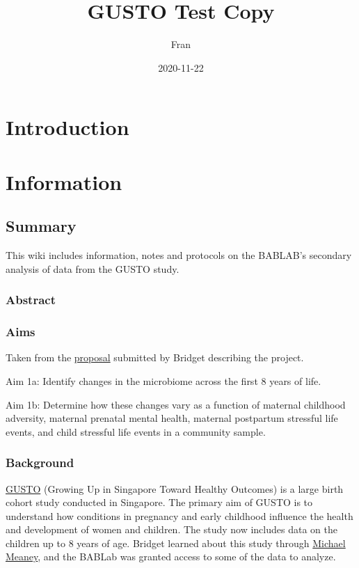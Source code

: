 \documentclass[
]{book}
\title{GUSTO Test Copy}
\author{Fran}
\date{2020-11-22}
\begin{document}
\maketitle

{
\setcounter{tocdepth}{1}
\tableofcontents
}
\hypertarget{introduction}{%
\chapter{Introduction}\label{introduction}}

\hypertarget{information}{%
\chapter{Information}\label{information}}

\hypertarget{summary}{%
\section{Summary}\label{summary}}

This wiki includes information, notes and protocols on the BABLAB's secondary analysis of data from the GUSTO study.

\hypertarget{abstract}{%
\subsection{Abstract}\label{abstract}}

\hypertarget{aims}{%
\subsection{Aims}\label{aims}}

Taken from the \href{https://ucla.app.box.com/file/740587024475}{proposal} submitted by Bridget describing the project.

Aim 1a: Identify changes in the microbiome across the first 8 years of life.

Aim 1b: Determine how these changes vary as a function of maternal childhood adversity, maternal prenatal mental health, maternal postpartum stressful life events, and child stressful life events in a community sample.

\hypertarget{background}{%
\subsection{Background}\label{background}}

\href{http://www.gusto.sg/}{GUSTO} (Growing Up in Singapore Toward Healthy Outcomes) is a large birth cohort study conducted in Singapore. The primary aim of GUSTO is to understand how conditions in pregnancy and early childhood influence the health and development of women and children. The study now includes data on the children up to 8 years of age. Bridget learned about this study through \href{https://douglas.research.mcgill.ca/michael-meaney}{Michael Meaney}, and the BABLab was granted access to some of the data to analyze.
\end{document}
